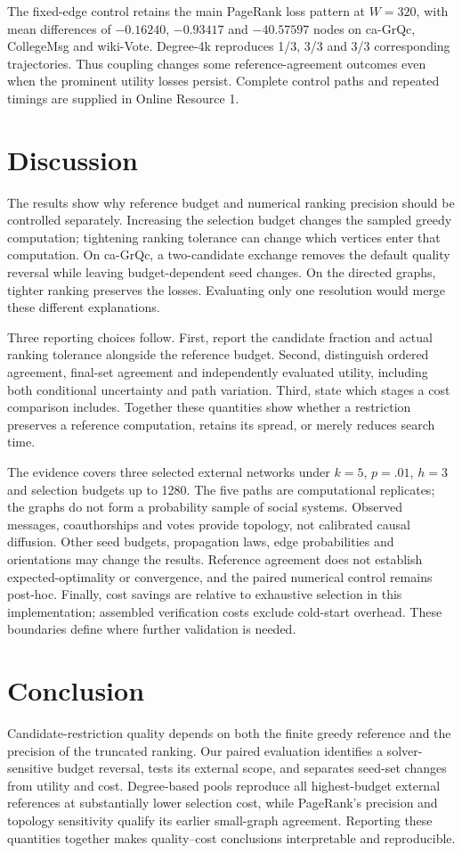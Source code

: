 \documentclass[smallextended]{svjour3}
\begin{document}
The fixed-edge control retains the main PageRank loss pattern at $W=320$, with mean differences of $-0.16240$, $-0.93417$ and $-40.57597$ nodes on ca-GrQc, CollegeMsg and wiki-Vote. Degree-4k reproduces 1/3, 3/3 and 3/3 corresponding trajectories. Thus coupling changes some reference-agreement outcomes even when the prominent utility losses persist. Complete control paths and repeated timings are supplied in Online Resource 1.
\FloatBarrier

\section{Discussion}
The results show why reference budget and numerical ranking precision should be controlled separately. Increasing the selection budget changes the sampled greedy computation; tightening ranking tolerance can change which vertices enter that computation. On ca-GrQc, a two-candidate exchange removes the default quality reversal while leaving budget-dependent seed changes. On the directed graphs, tighter ranking preserves the losses. Evaluating only one resolution would merge these different explanations.

Three reporting choices follow. First, report the candidate fraction and actual ranking tolerance alongside the reference budget. Second, distinguish ordered agreement, final-set agreement and independently evaluated utility, including both conditional uncertainty and path variation. Third, state which stages a cost comparison includes. Together these quantities show whether a restriction preserves a reference computation, retains its spread, or merely reduces search time.

The evidence covers three selected external networks under $k=5$, $p=.01$, $h=3$ and selection budgets up to 1280. The five paths are computational replicates; the graphs do not form a probability sample of social systems. Observed messages, coauthorships and votes provide topology, not calibrated causal diffusion. Other seed budgets, propagation laws, edge probabilities and orientations may change the results. Reference agreement does not establish expected-optimality or convergence, and the paired numerical control remains post-hoc. Finally, cost savings are relative to exhaustive selection in this implementation; assembled verification costs exclude cold-start overhead. These boundaries define where further validation is needed.

\section{Conclusion}
Candidate-restriction quality depends on both the finite greedy reference and the precision of the truncated ranking. Our paired evaluation identifies a solver-sensitive budget reversal, tests its external scope, and separates seed-set changes from utility and cost. Degree-based pools reproduce all highest-budget external references at substantially lower selection cost, while PageRank's precision and topology sensitivity qualify its earlier small-graph agreement. Reporting these quantities together makes quality--cost conclusions interpretable and reproducible.
\end{document}
